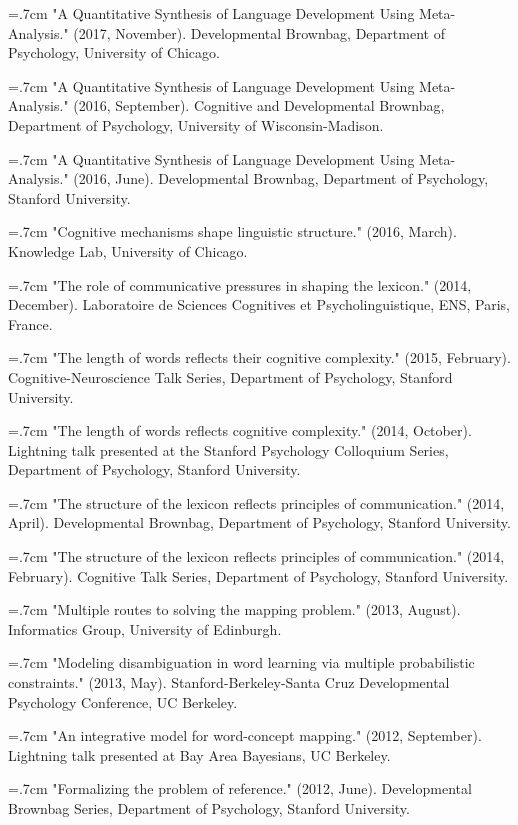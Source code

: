 \documentclass[letterpaper]{article}
\begin{document}
\hangindent=.7cm "A Quantitative Synthesis of Language Development Using Meta-Analysis." (2017, November). Developmental Brownbag, Department of Psychology,  University of Chicago.

\hangindent=.7cm "A Quantitative Synthesis of Language Development Using Meta-Analysis." (2016, September). Cognitive and Developmental Brownbag, Department of Psychology,  University of Wisconsin-Madison.

\hangindent=.7cm "A Quantitative Synthesis of Language Development Using Meta-Analysis." (2016, June). Developmental Brownbag, Department of Psychology,  Stanford University.

\hangindent=.7cm  "Cognitive mechanisms shape linguistic structure."  (2016, March).  Knowledge Lab, University of Chicago.

\hangindent=.7cm "The role of communicative pressures in shaping the lexicon." (2014, December). Laboratoire de Sciences Cognitives et Psycholinguistique, ENS, Paris, France.

\hangindent=.7cm "The length of words reflects their cognitive complexity." (2015, February). Cognitive-Neuroscience Talk Series, Department of Psychology, Stanford University.

\hangindent=.7cm "The length of words reflects cognitive complexity." (2014, October). Lightning talk presented at the Stanford Psychology Colloquium Series, Department of Psychology, Stanford University.


\hangindent=.7cm "The structure of the lexicon reflects principles of communication." (2014, April). Developmental Brownbag, Department of Psychology, Stanford University.

\hangindent=.7cm "The structure of the lexicon reflects principles of communication." (2014, February). Cognitive Talk Series, Department of Psychology, Stanford University.

\hangindent=.7cm "Multiple routes to solving the mapping problem." (2013, August). Informatics Group, University of Edinburgh.

\hangindent=.7cm "Modeling disambiguation in word learning via multiple probabilistic constraints." (2013, May). Stanford-Berkeley-Santa Cruz Developmental Psychology Conference, UC Berkeley.

 \hangindent=.7cm "An integrative model for word-concept mapping." (2012, September). Lightning talk presented at Bay Area Bayesians, UC Berkeley.

\hangindent=.7cm "Formalizing the problem of reference."  (2012, June). Developmental Brownbag Series, Department of Psychology, Stanford University.
\end{document}
